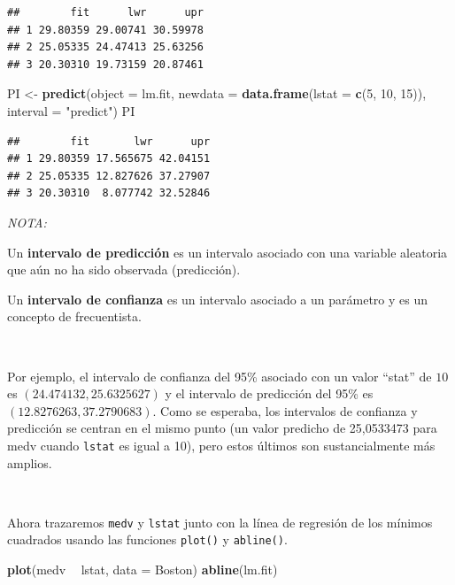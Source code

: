 \documentclass[]{book}
\newenvironment{Shaded}{\begin{snugshade}}{\end{snugshade}}
\newcommand{\KeywordTok}[1]{\textcolor[rgb]{0.13,0.29,0.53}{\textbf{#1}}}
\newcommand{\DataTypeTok}[1]{\textcolor[rgb]{0.13,0.29,0.53}{#1}}
\newcommand{\DecValTok}[1]{\textcolor[rgb]{0.00,0.00,0.81}{#1}}
\newcommand{\StringTok}[1]{\textcolor[rgb]{0.31,0.60,0.02}{#1}}
\newcommand{\OperatorTok}[1]{\textcolor[rgb]{0.81,0.36,0.00}{\textbf{#1}}}
\newcommand{\NormalTok}[1]{#1}
\begin{document}
\begin{verbatim}
##        fit      lwr      upr
## 1 29.80359 29.00741 30.59978
## 2 25.05335 24.47413 25.63256
## 3 20.30310 19.73159 20.87461
\end{verbatim}

\begin{Shaded}
\begin{Highlighting}[]
\NormalTok{PI <-}\StringTok{ }\KeywordTok{predict}\NormalTok{(}\DataTypeTok{object =}\NormalTok{ lm.fit, }\DataTypeTok{newdata =} \KeywordTok{data.frame}\NormalTok{(}\DataTypeTok{lstat =} \KeywordTok{c}\NormalTok{(}\DecValTok{5}\NormalTok{, }\DecValTok{10}\NormalTok{, }\DecValTok{15}\NormalTok{)), }
              \DataTypeTok{interval =} \StringTok{"predict"}\NormalTok{)}
\NormalTok{PI}
\end{Highlighting}
\end{Shaded}

\begin{verbatim}
##        fit       lwr      upr
## 1 29.80359 17.565675 42.04151
## 2 25.05335 12.827626 37.27907
## 3 20.30310  8.077742 32.52846
\end{verbatim}

\emph{NOTA:}

Un \textbf{intervalo de predicción} es un intervalo asociado con una
variable aleatoria que aún no ha sido observada (predicción).

Un \textbf{intervalo de confianza} es un intervalo asociado a un
parámetro y es un concepto de frecuentista.

~

Por ejemplo, el intervalo de confianza del 95\% asociado con un valor
``stat'' de \(10\) es \((24.474132, 25.6325627)\) y el intervalo de
predicción del 95\% es \((12.8276263, 37.2790683)\). Como se esperaba,
los intervalos de confianza y predicción se centran en el mismo punto
(un valor predicho de 25,0533473 para medv cuando \texttt{lstat} es
igual a 10), pero estos últimos son sustancialmente más amplios.

~

Ahora trazaremos \texttt{medv} y \texttt{lstat} junto con la línea de
regresión de los mínimos cuadrados usando las funciones \texttt{plot()}
y \texttt{abline()}.

\begin{Shaded}
\begin{Highlighting}[]
\KeywordTok{plot}\NormalTok{(medv }\OperatorTok{~}\StringTok{ }\NormalTok{lstat, }\DataTypeTok{data =}\NormalTok{ Boston)}
\KeywordTok{abline}\NormalTok{(lm.fit)}
\end{Highlighting}
\end{Shaded}
\end{document}
